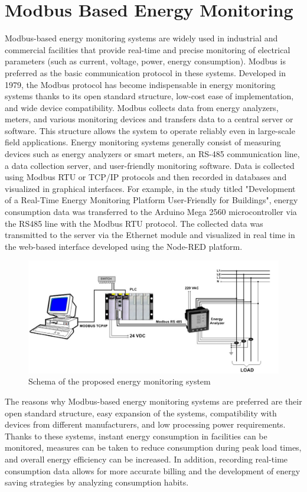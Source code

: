 \section{Modbus Based Energy Monitoring}

Modbus-based energy monitoring systems are widely used in industrial and commercial facilities that provide real-time and precise monitoring of electrical parameters (such as current, voltage, power, energy consumption). Modbus is preferred as the basic communication protocol in these systems. Developed in 1979, the Modbus protocol has become indispensable in energy monitoring systems thanks to its open standard structure, low-cost ease of implementation, and wide device compatibility.
Modbus collects data from energy analyzers, meters, and various monitoring devices and transfers data to a central server or software. This structure allows the system to operate reliably even in large-scale field applications.
Energy monitoring systems generally consist of measuring devices such as energy analyzers or smart meters, an RS-485 communication line, a data collection server, and user-friendly monitoring software. Data is collected using Modbus RTU or TCP/IP protocols and then recorded in databases and visualized in graphical interfaces.
For example, in the study titled "Development of a Real-Time Energy Monitoring Platform User-Friendly for Buildings", energy consumption data was transferred to the Arduino Mega 2560 microcontroller via the RS485 line with the Modbus RTU protocol. The collected data was transmitted to the server via the Ethernet module and visualized in real time in the web-based interface developed using the Node-RED platform.
\begin{figure}[H]
    \centering
    \includegraphics[width=0.8\columnwidth]{imgs/Schema of the proposed energy monitoring system.png}
    \caption[Short description for list of figures]{Schema of the proposed energy monitoring system }
    \label{fig-magnitude}
    \end{figure}%

    The reasons why Modbus-based energy monitoring systems are preferred are their open standard structure, easy expansion of the systems, compatibility with devices from different manufacturers, and low processing power requirements. Thanks to these systems, instant energy consumption in facilities can be monitored, measures can be taken to reduce consumption during peak load times, and overall energy efficiency can be increased. In addition, recording real-time consumption data allows for more accurate billing and the development of energy saving strategies by analyzing consumption habits.
    
